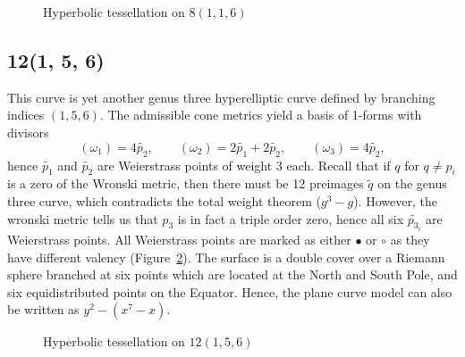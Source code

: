 \documentclass[12pt,reqno]{amsart}
\theoremstyle{definition}
\theoremstyle{remark}
\begin{document}
\begin{figure}[htbp]
    \centering
    \caption{Hyperbolic tessellation on $8(1, 1, 6)$}%
    \label{fig:116}%
\end{figure}




\subsection*{12(1, 5, 6)}
This curve is yet another genus three hyperelliptic curve defined by branching indices $(1, 5, 6).$ The admissible cone metrics yield a basis of 1-forms with divisors $$(\omega_1) = 4 \widetilde{p_2}, \qquad (\omega_2) = 2 \widetilde{p_1} + 2 \widetilde{p_2}, \qquad (\omega_3) = 4 \widetilde{p_2},$$ hence $\widetilde{p_1}$ and $\widetilde{p_2}$ are Weierstrass points of weight 3 each. Recall that if $q$ for $q \neq p_i$ is a zero of the Wronski metric, then there must be 12 preimages $\widetilde{q}$ on the genus three curve, which contradicts the total weight theorem ($g^3 - g$). However, the wronski metric tells us that $p_3$ is in fact a triple order zero, hence all six $\widetilde{p_{3_i}}$ are Weierstrass points. All Weierstrass points are marked as either $\bullet$ or $\circ$ as they have different valency (Figure~\ref{fig:156}). The surface is a double cover over a Riemann sphere branched at six points which are located at the North and South Pole, and six equidistributed points on the Equator. Hence, the plane curve model can also be written as $y^2 - (x^7 - x).$

\begin{figure}[htbp]
    \centering
    \caption{Hyperbolic tessellation on $12(1, 5, 6)$}%
    \label{fig:156}%
\end{figure}
\end{document}
